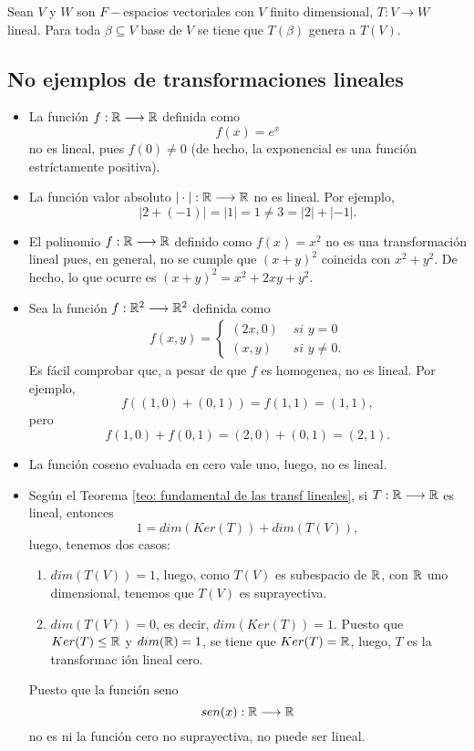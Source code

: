 
\begin{cor}
	\label{cor: imagen de base de V bajo lineal genera a W}
Sean $V$ y $W$ son $F-$espacios vectoriales con $V$
finito dimensional, $T: V \longrightarrow W$ lineal.
Para toda $\beta \subseteq V$ base de $V$ se tiene que
$T(\beta)$ genera a $T(V)$.
\end{cor}



\subsection{No ejemplos de transformaciones lineales}

\begin{itemize}
	\item La función $f: \mathbb{R} \longrightarrow \mathbb{R}$ definida como
	\[
	f(x) = e^{x}
	\]
	no es lineal, pues $f(0) \neq 0$ (de hecho, la exponencial
	es una función estríctamente positiva).
	\item La función valor absoluto $| \cdot | : \mathbb{R} \longrightarrow \mathbb{R}$
	no es lineal. Por ejemplo,
	\[
	|2+(-1)| = |1| = 1 \neq 3 = |2| + |-1|.
	\]
	\item El polinomio $f: \mathbb{R} \longrightarrow \mathbb{R}$
	definido como $f(x) = x^{2}$ no es una transformación lineal pues,
	en general, no se cumple que $(x+y)^{2}$ coincida con
	$x^{2} + y^{2}$. De hecho, lo que ocurre es 
	$(x+y)^{2} = x^{2} + 2xy + y^{2}$.
	\item Sea la función $f : \mathbb{R}^{2} \longrightarrow \mathbb{R}^{2}$ definida como
	\begin{align*}
	f(x, y )= \begin{cases}
	(2x, 0) & \textit{ si } y = 0 \\
	(x, y) & \textit{ si } y \neq 0.
	\end{cases}
	\end{align*}
	Es fácil comprobar que, a pesar de que $f$ es homogenea, no es
	lineal. Por ejemplo,
	\[
	f((1, 0) + (0, 1)) = f(1, 1) = (1, 1),
	\]
	pero
	\[
	f(1, 0) + f(0, 1) = (2, 0) + (0, 1) = (2, 1).
	\]
	\item La función coseno evaluada en cero vale uno, luego, 
	no es lineal.
	\item Según el Teorema \ref{teo: fundamental de las transf lineales},
	si $T: \mathbb{R} \longrightarrow \mathbb{R}$ es lineal, entonces
	\[
	1 = dim(Ker(T)) + dim(T(V)),
	\]
	luego, tenemos dos casos:
	\begin{enumerate}
		\item $dim(T(V)) = 1$, luego, como $T(V)$ es subespacio
		de $\mathbb{R}$, con $\mathbb{R}$ uno dimensional, tenemos que 
		$T(V)$ es suprayectiva.
		\item $dim(T(V)) = 0$, es decir,
		$dim(Ker(T)) = 1$. Puesto que $Ker(T) \leq \mathbb{R}$
		y $dim(\mathbb{R}) = 1$, se tiene que $Ker(T) = \mathbb{R}$, luego,
		$T$ es la transformac
		ión lineal cero.
	\end{enumerate}
	Puesto que la función seno 
	\[
	sen(x) : \mathbb{R} \longrightarrow \mathbb{R}
	\]
	no es ni la función cero no suprayectiva, no puede ser lineal.
\end{itemize}


